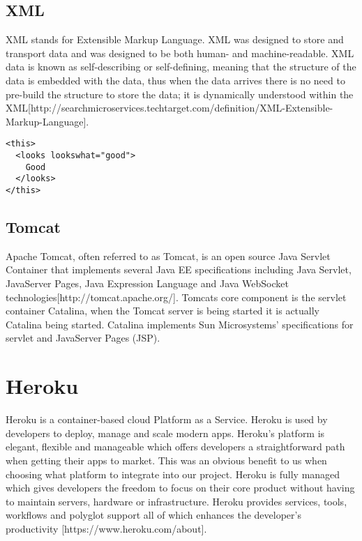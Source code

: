 \subsection{XML}
XML stands for Extensible Markup Language. XML was designed to store and transport data and was designed to be both human- and machine-readable. XML data is known as self-describing or self-defining, meaning that the structure of the data is embedded with the data, thus when the data arrives there is no need to pre-build the structure to store the data; it is dynamically understood within the XML[http://searchmicroservices.techtarget.com/definition/XML-Extensible-Markup-Language].
\begin{verbatim}
<this>
  <looks lookswhat="good">
    Good
  </looks>
</this>
\end{verbatim}

\subsection{Tomcat}
Apache Tomcat, often referred to as Tomcat, is an open source Java Servlet Container that implements several Java EE specifications including Java Servlet, JavaServer Pages, Java Expression Language and Java WebSocket technologies[http://tomcat.apache.org/]. Tomcats core component is the servlet container Catalina, when the Tomcat server is being started it is actually Catalina being started. Catalina implements Sun Microsystems' specifications for servlet and JavaServer Pages (JSP).

\section{Heroku}
Heroku is a container-based cloud Platform as a Service. Heroku is used by developers to deploy, manage and scale modern apps. Heroku’s platform is elegant, flexible and manageable which offers developers a straightforward path when getting their apps to market. This was an obvious benefit to us when choosing what platform to integrate into our project. Heroku is fully managed which gives developers the freedom to focus on their core product without having to maintain servers, hardware or infrastructure. Heroku provides services, tools, workflows and polyglot support all of which enhances the developer’s productivity [https://www.heroku.com/about].

